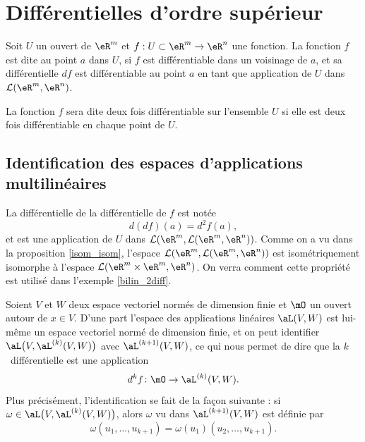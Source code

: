 \section{Différentielles d'ordre supérieur}		\label{SecDiffOrdSup}
\begin{definition}
	Soit $U$ un ouvert de $\eR^m$ et  $f:U\subset\eR^m\to \eR^n$ une fonction. La fonction $f$ est dite  au point $a$ dans $U$,  si $f$ est différentiable dans un voisinage de $a$, et sa différentielle $df$ est différentiable au point $a$ en tant que application de $U$ dans $\mathcal{L}(\eR^m, \eR^n)$.  

La fonction $f$ sera dite deux fois différentiable sur l'ensemble $U$ si elle est deux fois différentiable en chaque point de $U$.

\end{definition}

\subsection{Identification des espaces d'applications multilinéaires}

La différentielle de la différentielle de $f$ est notée 
\[
d(df)(a)=d^2f(a),
\]
et est une application de $U$ dans $\mathcal{L}(\eR^m,\mathcal{L}(\eR^m, \eR^n) )$. Comme on a vu dans la proposition \ref{isom_isom}, l'espace $\mathcal{L}(\eR^m,\mathcal{L}(\eR^m, \eR^n) )$ est isométriquement isomorphe à l'espace $\mathcal{L}(\eR^m\times\eR^m, \eR^n )$. On verra comment cette propriété  est utilisé dans l'exemple \ref{bilin_2diff}.


Soient \( V\) et \( W\) deux espace vectoriel normés de dimension finie et \( \mO\) un ouvert autour de \( x\in V\). D'une part l'espace des applications linéaires \( \aL(V,W)\) est lui-même un espace vectoriel normé de dimension finie, et on peut identifier \(  \aL\big( V,\aL^{(k)}(V,W) \big)\) avec \( \aL^{(k+1)}(V,W)\), ce qui nous permet de dire que la \( k\)\ieme\ différentielle est une application
\begin{equation}
    d^kf\colon \mO\to \aL^{(k)}(V,W).
\end{equation}
Plus précisément, l'identification se fait de la façon suivante : si \( \omega\in \aL\big( V,\aL^{(k)}(V,W) \big)\), alors \( \omega\) vu dans \( \aL^{(k+1)}(V,W)\) est définie par
\begin{equation}
    \omega(u_1,\ldots, u_{k+1})=\omega(u_1)(u_2,\ldots, u_{k+1}).    
\end{equation}

